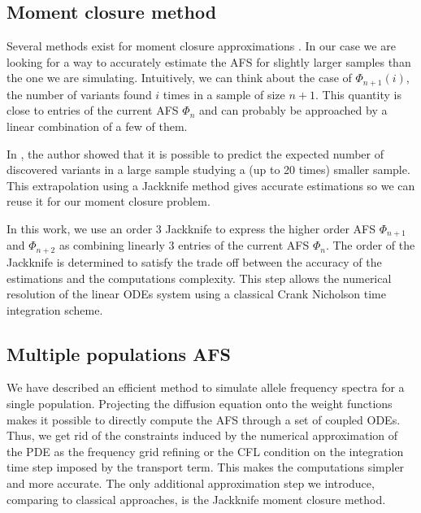  
\subsection{Moment closure method}
Several methods exist for moment closure approximations \cite{kuehn2016}. In our case we are looking for a way to accurately estimate the AFS for slightly larger samples than the one we are simulating. Intuitively, we can think about the case of $\Phi_{n+1}(i)$, the number of variants found $i$ times in a sample of size $n+1$. This quantity is close to entries of the current AFS $\Phi_n$ and can probably be approached by a linear combination of a few of them.

In \cite{gravel2014}, the author showed that it is possible to predict the expected number of discovered variants in a large sample studying a (up to 20 times) smaller sample. This extrapolation using a Jackknife method gives accurate estimations so we can reuse it for our moment closure problem.

In this work, we use an order 3 Jackknife to express the higher order AFS $\Phi_{n+1}$ and $\Phi_{n+2}$ as combining linearly 3 entries of the current AFS $\Phi_n$. The order of the Jackknife is determined to satisfy the trade off between the accuracy of the estimations and the computations complexity. This step allows the numerical resolution of the linear ODEs system using a classical Crank Nicholson time integration scheme.  

\subsection{Multiple populations AFS}
We have described an efficient method to simulate allele frequency spectra for a single population. Projecting the diffusion equation onto the weight functions makes it possible to directly compute the AFS through a set of coupled ODEs. Thus, we get rid of the constraints induced by the numerical approximation of the PDE as the frequency grid refining or the CFL condition on the integration time step imposed by the transport term. This makes the computations simpler and more accurate. The only additional approximation step we introduce, comparing to classical approaches, is the Jackknife moment closure method.

